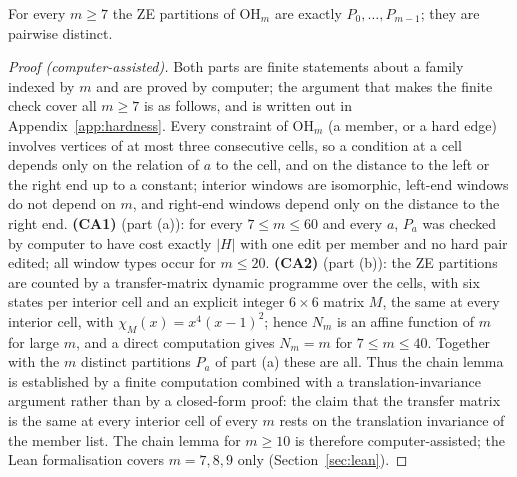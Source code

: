 \begin{lemma}\label{lem:hchain}
For every $m\ge7$ the ZE partitions of $\mathrm{OH}_m$ are exactly $P_0,\dots,P_{m-1}$; they are pairwise distinct.
\end{lemma}
\begin{proof}[Proof (computer-assisted)]
Both parts are finite statements about a family indexed by $m$ and are proved by computer; the argument that makes the finite check cover all $m\ge7$ is as follows, and is written out in Appendix~\ref{app:hardness}. Every constraint of $\mathrm{OH}_m$ (a member, or a hard edge) involves vertices of at most three consecutive cells, so a condition at a cell depends only on the relation of $a$ to the cell, and on the distance to the left or the right end up to a constant; interior windows are isomorphic, left-end windows do not depend on $m$, and right-end windows depend only on the distance to the right end. \textbf{(CA1)} (part (a)): for every $7\le m\le60$ and every $a$, $P_a$ was checked by computer to have cost exactly $|H|$ with one edit per member and no hard pair edited; all window types occur for $m\le20$. \textbf{(CA2)} (part (b)): the ZE partitions are counted by a transfer-matrix dynamic programme over the cells, with six states per interior cell and an explicit integer $6\times6$ matrix $M$, the same at every interior cell, with $\chi_M(x)=x^4(x-1)^2$; hence $N_m$ is an affine function of $m$ for large $m$, and a direct computation gives $N_m=m$ for $7\le m\le40$. Together with the $m$ distinct partitions $P_a$ of part (a) these are all. Thus the chain lemma is established by a finite computation combined with a translation-invariance argument rather than by a closed-form proof: the claim that the transfer matrix is the same at every interior cell of every $m$ rests on the translation invariance of the member list. The chain lemma for $m\ge10$ is therefore computer-assisted; the Lean formalisation covers $m=7,8,9$ only (Section~\ref{sec:lean}).
\end{proof}


